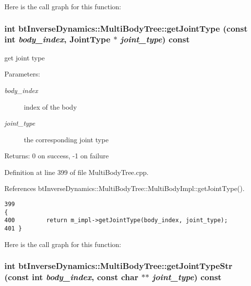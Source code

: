 Here is the call graph for this function:\hypertarget{classbt_inverse_dynamics_1_1_multi_body_tree_364bd17e226b15ab6615de4bf8de110d}{
\subsubsection[getJointType]{\setlength{\rightskip}{0pt plus 5cm}int btInverseDynamics::MultiBodyTree::getJointType (const int {\em body\_\-index}, \/  JointType $\ast$ {\em joint\_\-type}) const}}
\label{classbt_inverse_dynamics_1_1_multi_body_tree_364bd17e226b15ab6615de4bf8de110d}


get joint type \begin{Desc}
\item[Parameters:]
\begin{description}
\item[{\em body\_\-index}]index of the body \item[{\em joint\_\-type}]the corresponding joint type \end{description}
\end{Desc}
\begin{Desc}
\item[Returns:]0 on success, -1 on failure \end{Desc}


Definition at line 399 of file MultiBodyTree.cpp.

References btInverseDynamics::MultiBodyTree::MultiBodyImpl::getJointType().

\begin{Code}\begin{verbatim}399                                                                                  {
400         return m_impl->getJointType(body_index, joint_type);
401 }
\end{verbatim}
\end{Code}




Here is the call graph for this function:\hypertarget{classbt_inverse_dynamics_1_1_multi_body_tree_6591655d73601c531baed6121f89add5}{
\subsubsection[getJointTypeStr]{\setlength{\rightskip}{0pt plus 5cm}int btInverseDynamics::MultiBodyTree::getJointTypeStr (const int {\em body\_\-index}, \/  const char $\ast$$\ast$ {\em joint\_\-type}) const}}
\label{classbt_inverse_dynamics_1_1_multi_body_tree_6591655d73601c531baed6121f89add5}


